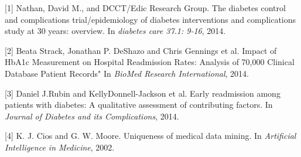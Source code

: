 \documentclass[twoside,11pt]{article}
\begin{document}
[1] Nathan, David M., and DCCT/Edic Research Group. The diabetes control and complications trial/epidemiology of diabetes interventions and complications study at 30 years: overview. In \emph{diabetes care 37.1: 9-16}, 2014.

[2] Beata Strack, Jonathan P. DeShazo and Chris Gennings et al. Impact of HbA1c Measurement on Hospital Readmission Rates: Analysis of 70,000 Clinical Database Patient Records" In \emph{BioMed Research International}, 2014.

[3] Daniel J.Rubin and KellyDonnell-Jackson et al. Early readmission among patients with diabetes: A qualitative assessment of contributing factors. In \emph{Journal of Diabetes and its Complications}, 2014.

[4] K. J. Cios and G. W. Moore. Uniqueness of medical data mining. In \emph{Artificial Intelligence in Medicine}, 2002.
\end{document}
